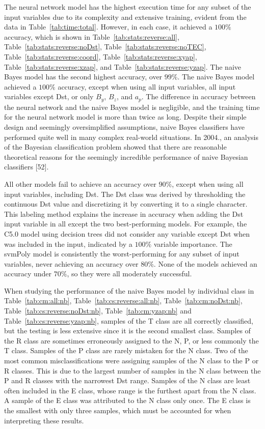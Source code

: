 \documentclass[preprint,12pt]{elsarticle}
\begin{document}
The neural network model has the highest execution time for any subset of the input variables due to its complexity and extensive training, evident from the data in Table~\ref{tab:time:total}. However, in each case, it achieved a $100\%$ accuracy, which is shown in Table~\ref{tab:stats:reverse:all}, Table~\ref{tab:stats:reverse:noDst}, Table~\ref{tab:stats:reverse:noTEC}, Table~\ref{tab:stats:reverse:coord}, Table~\ref{tab:stats:reverse:xyap}, Table~\ref{tab:stats:reverse:xzap}, and Table~\ref{tab:stats:reverse:yzap}. The naive Bayes model has the second highest accuracy, over $99\%$. The naive Bayes model achieved a $100\%$ accuracy, except when using all input variables, all input variables except Dst, or only $B_{y}$, $B_{z}$, and $a_{p}$. The difference in accuracy between the neural network and the naive Bayes model is negligible, and the training time for the neural network model is more than twice as long. Despite their simple design and seemingly oversimplified assumptions, naive Bayes classifiers have performed quite well in many complex real-world situations. In 2004., an analysis of the Bayesian classification problem showed that there are reasonable theoretical reasons for the seemingly incredible performance of naive Bayesian classifiers [52].

All other models fail to achieve an accuracy over $90\%$, except when using all input variables, including Dst. The Dst class was derived by thresholding the continuous Dst value and discretizing it by converting it to a single character. This labeling method explains the increase in accuracy when adding the Dst input variable in all except the two best-performing models. For example, the C5.0 model using decision trees did not consider any variable except Dst when was included in the input, indicated by a $100\%$ variable importance. The svmPoly model is consistently the worst-performing for any subset of input variables, never achieving an accuracy over $80\%$. None of the models achieved an accuracy under $70\%$, so they were all moderately successful.

When studying the performance of the naive Bayes model by individual class in Table~\ref{tab:cm:all:nb}, Table~\ref{tab:cs:reverse:all:nb}, Table~\ref{tab:cm:noDst:nb}, Table~\ref{tab:cs:reverse:noDst:nb}, Table~\ref{tab:cm:yzap:nb} and Table~\ref{tab:cs:reverse:yzap:nb}, samples of the T class are all correctly classified, but the testing is less extensive since it is the second smallest class. Samples of the R class are sometimes erroneously assigned to the N, P, or less commonly the T class. Samples of the P class are rarely mistaken for the N class. Two of the most common misclassifications were assigning samples of the N class to the P or R classes. This is due to the largest number of samples in the N class between the P and R classes with the narrowest Dst range. Samples of the N class are least often included in the E class, whose range is the furthest apart from the N class. A sample of the E class was attributed to the N class only once. The E class is the smallest with only three samples, which must be accounted for when interpreting these results.
\end{document}
